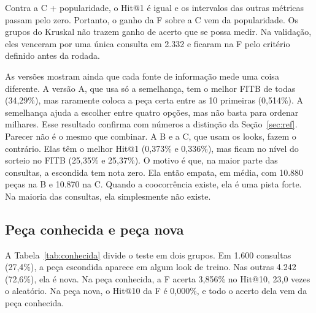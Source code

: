 \documentclass[conference]{IEEEtran}
\begin{document}
Contra a C + popularidade, o Hit@1 é igual e os intervalos das outras métricas passam pelo zero. Portanto, o ganho da F sobre a C vem da popularidade. Os grupos do Kruskal não trazem ganho de acerto que se possa medir. Na validação, eles venceram por uma única consulta em 2.332 e ficaram na F pelo critério definido antes da rodada.

As versões mostram ainda que cada fonte de informação mede uma coisa diferente. A versão A, que usa só a semelhança, tem o melhor FITB de todas (34,29\%), mas raramente coloca a peça certa entre as 10 primeiras (0,514\%). A semelhança ajuda a escolher entre quatro opções, mas não basta para ordenar milhares. Esse resultado confirma com números a distinção da Seção~\ref{sec:ref}. Parecer não é o mesmo que combinar. A B e a C, que usam os looks, fazem o contrário. Elas têm o melhor Hit@1 (0,373\% e 0,336\%), mas ficam no nível do sorteio no FITB (25,35\% e 25,37\%). O motivo é que, na maior parte das consultas, a escondida tem nota zero. Ela então empata, em média, com 10.880 peças na B e 10.870 na C. Quando a coocorrência existe, ela é uma pista forte. Na maioria das consultas, ela simplesmente não existe.

\subsection{Peça conhecida e peça nova}

A Tabela~\ref{tab:conhecida} divide o teste em dois grupos. Em 1.600 consultas (27,4\%), a peça escondida aparece em algum look de treino. Nas outras 4.242 (72,6\%), ela é nova. Na peça conhecida, a F acerta 3,856\% no Hit@10, 23,0 vezes o aleatório. Na peça nova, o Hit@10 da F é 0,000\%, e todo o acerto dela vem da peça conhecida.
\end{document}
